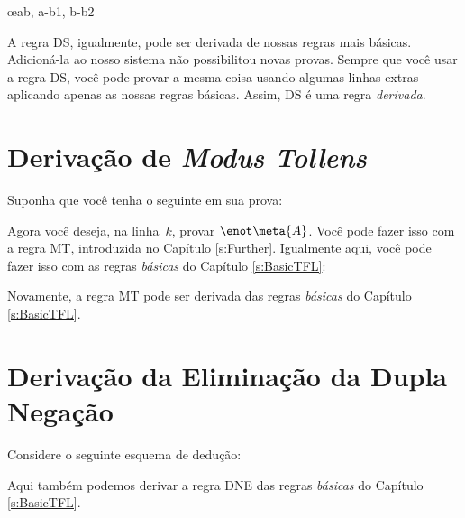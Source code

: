 	\begin{fitchproof}
		\open
		\close
		\open
		\close
	\oe{ab, a-b1, b-b2}
\end{fitchproof}
A regra DS, igualmente, pode ser derivada de nossas regras mais básicas. Adicioná-la ao nosso sistema não possibilitou novas provas. Sempre  que você usar a regra DS, você pode provar a mesma coisa usando algumas linhas extras aplicando apenas as nossas regras básicas. Assim, DS é uma regra \emph{derivada}.

\section{Derivação de \emph{Modus Tollens}}
Suponha que você tenha o seguinte em sua prova:
\begin{fitchproof}
\end{fitchproof}
Agora você deseja, na linha~$k$, provar $\enot \meta{A}$. Você pode fazer isso com a regra  MT, introduzida no Capítulo \ref{s:Further}.  Igualmente aqui, você pode fazer isso com as regras  \emph{básicas} do Capítulo \ref{s:BasicTFL}:
 
\begin{fitchproof}
		\open
		\close
\end{fitchproof}
Novamente, a regra  MT pode ser derivada das regras  \emph{básicas} do Capítulo \ref{s:BasicTFL}.


\section{Derivação da Eliminação da Dupla Negação}
Considere o seguinte esquema de dedução:
	\begin{fitchproof}
	\open
	\close
\end{fitchproof}
Aqui também podemos derivar a regra DNE das regras \emph{básicas} do Capítulo \ref{s:BasicTFL}.

